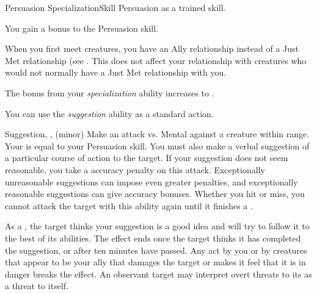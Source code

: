     \begin{feat}{Persuasion Specialization}{Skill}
        \featpre Persuasion as a trained skill.

         You gain a  bonus to the Persuasion skill.

         When you first meet creatures, you have an Ally relationship instead of a Just Met relationship (see .
        This does not affect your relationship with creatures who would not normally have a Just Met relationship with you.

         The bonus from your \textit{specialization} ability increases to .

         You can use the \textit{suggestion} ability as a standard action.
        \begin{sustainability}{Suggestion}{, ,  (minor)}
            \rankline
            Make an attack vs. Mental against a creature within \rngmed range.
            Your  is equal to your Persuasion skill.
            You must also make a verbal suggestion of a particular course of action to the target.
            If your suggestion does not seem reasonable, you take a  accuracy penalty on this attack.
            Exceptionally unreasonable suggestions can impose even greater penalties, and exceptionally reasonable suggestions can give accuracy bonuses.
            Whether you hit or miss, you cannot attack the target with this ability again until it finishes a .

            \hit As a , the target thinks your suggestion is a good idea and will try to follow it to the best of its abilities.
            The effect ends once the target thinks it has completed the suggestion, or after ten minutes have passed.
            Any act by you or by creatures that appear to be your ally that damages the target or makes it feel that it is in danger breaks the effect.
            An observant target may interpret overt threats to its  as a threat to itself.
        \end{sustainability}
    \end{feat}

